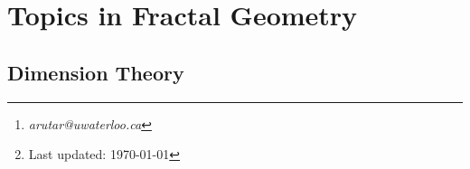 \documentclass[11pt, a4paper]{memoir}
\title{\subject}
\author{Alex Rutar\thanks{\itshape arutar@uwaterloo.ca}\\ University of Waterloo}
\date{\semester\thanks{Last updated: \today}}
\DeclareMathOperator{\N}{{\mathbb{N}}}
\DeclareMathOperator{\R}{{\mathbb{R}}}
\theoremstyle{change}
\theoremstyle{plain}
\theoremstyle{nonumberplain}
\newcommand{\defn}[1]{{\boldmath\bfseries #1}}
\newcommand{\TODO}[1]{[\textit{\textbf{TODO: #1}}]}
\numberwithin{equation}{section}
\begin{document}
\hypersetup{pageanchor=false}
\maketitle
\newpage
\frontmatter
\hypersetup{pageanchor=true}
\tableofcontents*
\newpage
\mainmatter


\chapter{Topics in Fractal Geometry}
\section{Dimension Theory}


\end{document}
